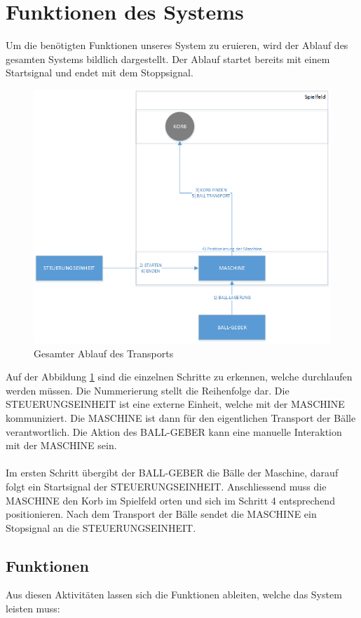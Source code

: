 \section{Funktionen des Systems}
Um die benötigten Funktionen unseres System zu eruieren, wird der Ablauf des gesamten Systems bildlich dargestellt. Der Ablauf startet bereits mit einem Startsignal und endet mit dem Stoppsignal.

\begin{figure}[h!]
\centering
\includegraphics[width=0.7\linewidth]{../../fig/ablauf-transport}
\caption[Gesamter Ablauf des Transports]{Gesamter Ablauf des Transports}
\label{fig:ablauf-transport}
\end{figure}

Auf der Abbildung \ref{fig:ablauf-transport} sind die einzelnen Schritte zu erkennen, welche durchlaufen werden müssen. Die Nummerierung stellt die Reihenfolge dar. Die STEUERUNGSEINHEIT ist eine externe Einheit, welche mit der MASCHINE kommuniziert. Die MASCHINE ist dann für den eigentlichen Transport der Bälle verantwortlich. Die Aktion des BALL-GEBER kann eine manuelle Interaktion mit der MASCHINE sein.\\
\\
Im ersten Schritt übergibt der BALL-GEBER die Bälle der Maschine, darauf folgt ein Startsignal der STEUERUNGSEINHEIT. Anschliessend muss die MASCHINE den Korb im Spielfeld orten und sich im Schritt 4 entsprechend positionieren. Nach dem Transport der Bälle sendet die MASCHINE ein Stopsignal an die STEUERUNGSEINHEIT.

\subsection{Funktionen}
Aus diesen Aktivitäten lassen sich die Funktionen ableiten, welche das System leisten muss:\\
 
